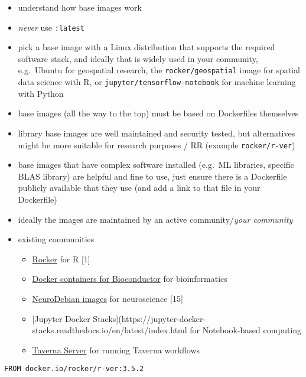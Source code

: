 \documentclass[10pt,letterpaper]{article}
\providecommand{\tightlist}{%
  \setlength{\itemsep}{0pt}\setlength{\parskip}{0pt}}
\begin{document}
\begin{itemize}
\tightlist
\item
  understand how base images work
\item
  \emph{never} use \texttt{:latest}
\item
  pick a base image with a Linux distribution that supports the required
  software stack, and ideally that is widely used in your community,
  e.g.~Ubuntu for geospatial research, the \texttt{rocker/geospatial}
  image for spatial data science with R, or
  \texttt{jupyter/tensorflow-notebook} for machine learning with Python
\item
  base images (all the way to the top) must be based on Dockerfiles
  themselves
\item
  library base images are well maintained and security tested, but
  alternatives might be more suitable for research purposes / RR
  (example \texttt{rocker/r-ver})
\item
  base images that have complex software installed (e.g.~ML libraries,
  specific BLAS library) are helpful and fine to use, just ensure there
  is a Dockerfile publicly available that they use (and add a link to
  that file in your Dockerfile)
\item
  ideally the images are maintained by an active community/\emph{your
  community}
\item
  existing communities

  \begin{itemize}
  \tightlist
  \item
    \href{https://www.rocker-project.org/}{Rocker} for R {[}1{]}
  \item
    \href{https://bioconductor.org/help/docker/}{Docker containers for
    Bioconductor} for bioinformatics
  \item
    \href{https://hub.docker.com/_/neurodebian}{NeuroDebian images} for
    neuroscience {[}15{]}
  \item
    {[}Jupyter Docker
    Stacks{]}(https://jupyter-docker-stacks.readthedocs.io/en/latest/index.html
    for Notebook-based computing
  \item
    \href{https://hub.docker.com/r/taverna/taverna-server}{Taverna
    Server} for running Taverna workflows
  \end{itemize}
\end{itemize}

\begin{verbatim}
FROM docker.io/rocker/r-ver:3.5.2
\end{verbatim}
\end{document}
